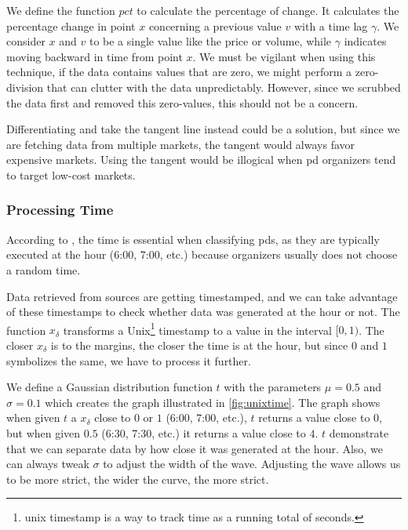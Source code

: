 We define the function $pct$ to calculate the percentage of change. It calculates the percentage change in point $x$ concerning a previous value $v$ with a time lag $\gamma$. We consider $x$ and $v$ to be a single value like the price or volume, while $\gamma$ indicates moving backward in time from point $x$. We must be vigilant when using this technique, if the data contains values that are zero, we might perform a zero-division that can clutter with the data unpredictably. However, since we scrubbed the data first and removed this zero-values, this should not be a concern.



Differentiating and take the tangent line instead could be a solution, but since we are fetching data from multiple markets, the tangent would always favor expensive markets. Using the tangent would be illogical when \ac{pd} organizers tend to target low-cost markets.

\subsubsection{Processing Time}
According to \cite{P&D_anatomy}, the time is essential when classifying \acp{pd}, as they are typically executed at the hour (6:00, 7:00, etc.) because organizers usually does not choose a random time.



Data retrieved from sources are getting timestamped, and we can take advantage of these timestamps to check whether data was generated at the hour or not. The function $x_\delta$ transforms a Unix\footnote{unix timestamp is a way to track time as a running total of seconds.} timestamp to a value in the interval $[0, 1)$. The closer $x_\delta$ is to the margins, the closer the time is at the hour, but since $0$ and $1$ symbolizes the same, we have to process it further.

We define a Gaussian distribution function $t$ with the parameters $\mu=0.5$ and $\sigma=0.1$ which creates the graph illustrated in \autoref{fig:unixtime}. The graph shows when given $t$ a $x_\delta$ close to $0$ or $1$ (6:00, 7:00, etc.), $t$ returns a value close to $0$, but when given $0.5$ (6:30, 7:30, etc.) it returns a value close to $4$. $t$ demonstrate that we can separate data by how close it was generated at the hour. Also, we can always tweak $\sigma$ to adjust the width of the wave. Adjusting the wave allows us to be more strict, the wider the curve, the more strict.

